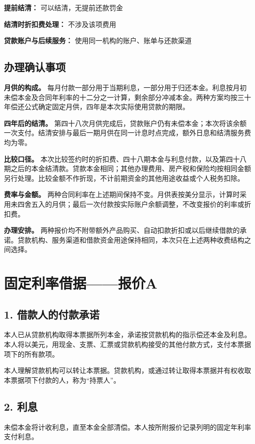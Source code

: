 \documentclass[UTF8,fontset=none,11pt,a4paper]{ctexart}
\begin{document}
\textbf{提前结清：} 可以结清，无提前还款罚金


\textbf{结清时折扣费处理：} 不涉及该项费用


\textbf{贷款账户与后续服务：} 使用同一机构的账户、账单与还款渠道


\subsection*{办理确认事项}
\textbf{月供的构成。} 每月付款一部分用于当期利息，一部分用于归还本金。利息按月初未偿本金及合同年利率的十二分之一计算，剩余部分冲减本金。两种方案均按三十年偿还公式确定固定月供，四年是本次实际使用贷款的期限。


\textbf{四年后的结清。} 第四十八次月供完成后，贷款账户仍有未偿本金；本次将该余额一次支付。结清安排与最后一期月供在同一计息时点完成，额外日息和结清服务费均为零。


\textbf{比较口径。} 本次比较签约时的折扣费、四十八期本金与利息付款，以及第四十八期之后的本金结清款。贷款本金相同；其他办理费用、房产税和保险均按相同金额另行处理。比较金额不作折现，不计前期资金的其他用途收益或个人税务扣除。


\textbf{费率与金额。} 两种合同利率在上述期间保持不变。月供表按美分显示，计算时采用未四舍五入的月供；最后一次付款按实际账户余额调整，不改变报价的利率或折扣费。


\textbf{办理安排。} 两种报价均不附带额外产品购买、自动扣款折扣或以后继续借款的承诺。贷款机构、服务渠道和借款资金用途保持相同，本次只在上述两种收费结构之间选择。


\section*{固定利率借据——报价A}
\subsection*{1. 借款人的付款承诺}
本人已从贷款机构取得本票据所列本金，承诺按贷款机构的指示偿还本金及利息。本人将以美元，用现金、支票、汇票或贷款机构接受的其他付款方式，支付本票据项下的所有款项。


本人理解贷款机构可以转让本票据。贷款机构，或通过转让取得本票据并有权收取本票据项下付款的人，称为“持票人”。


\subsection*{2. 利息}
未偿本金将计收利息，直至本金全部清偿。本人按所附报价记录列明的固定年利率支付利息。
\end{document}

